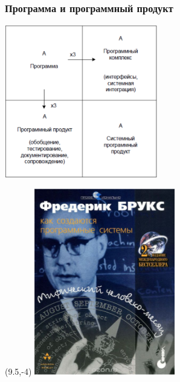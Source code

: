 \documentclass{../../slides-style}
\begin{document}
    \begin{frame}
        \frametitle{Программа и программный продукт}
        \begin{center}
            \includegraphics[width=0.5\textwidth]{brooksSquare.png}
        \end{center}
        \begin{textblock}{2}(9.5,-4)
            \includegraphics[width=\textwidth]{brooksCover.png}
        \end{textblock}
    \end{frame}
\end{document}
